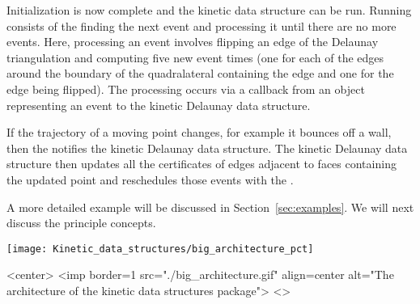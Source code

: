 Initialization is now complete and the kinetic data structure can be
run. Running consists of the  finding the next event
and processing it until there are no more events. Here, processing an
event involves flipping an edge of the Delaunay triangulation and
computing five new event times (one for each of the edges around the
boundary of the quadralateral containing the edge and one for the edge
being flipped). The processing occurs via a callback from an object
representing an event to the kinetic Delaunay data structure.

If the trajectory of a moving point changes, for example it bounces
off a wall, then the  notifies the kinetic Delaunay data
structure. The kinetic Delaunay data structure then updates all the
certificates of edges adjacent to faces containing the updated point and
reschedules those events with the .

A more detailed example will be discussed in
Section~\ref{sec:examples}. We will next discuss the principle
concepts.

\begin{figure*}[htb]
\begin{ccTexOnly}
\begin{center}
\texttt{[image: Kinetic\_data\_structures/big\_architecture\_pct]}
\end{center}
\end{ccTexOnly}
\begin{ccHtmlOnly}
<center>
<imp border=1 src="./big_architecture.gif" align=center alt="The architecture of the kinetic data structures package">
<\center>
\end{ccHtmlOnly}
\caption{ \label{fig:architecture} 
{\em Framework architecture:} Each large white box represents a main concept, the sub boxes their
contained concepts, and regular text their methods. A ``Uses'' arrow means
that a model of concept will generally use methods from (and therefore
should take as a template parameter) the target of the arrow.  A
``Provides model of'' arrow means that the source model provides an
implementation of the destination concept through a .
Finally, a ``Notifies'' arrow means that the class notifies the other
class of events using a standardized notification interface.  See
Section~\ref{sec:architecture} for a description of each of the main
concepts. }
\end{figure*}

